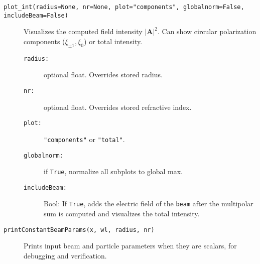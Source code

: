 \begin{description}
    \item[\texttt{plot\_int(radius=None, nr=None, plot="components", globalnorm=False, includeBeam=False)}]
    Visualizes the computed field intensity \( |\mathbf{A}|^2 \). Can show circular polarization components (\( \xi_{\pm1}, \xi_0 \)) or total intensity.
    \begin{description}
        \item[\texttt{radius:}] optional float. Overrides stored radius.
        \item[\texttt{nr:}] optional float. Overrides stored refractive index.
        \item[\texttt{plot:}] \texttt{"components"} or \texttt{"total"}.
        \item[\texttt{globalnorm:}] if \texttt{True}, normalize all subplots to global max.
        \item[\texttt{includeBeam:}] Bool: If \texttt{True}, adds the electric field of the \texttt{beam} after the multipolar sum is computed and visualizes the total intensity.
    \end{description}

    \item[\texttt{printConstantBeamParams(x, wl, radius, nr)}]
    Prints input beam and particle parameters when they are scalars, for debugging and verification.
\end{description}